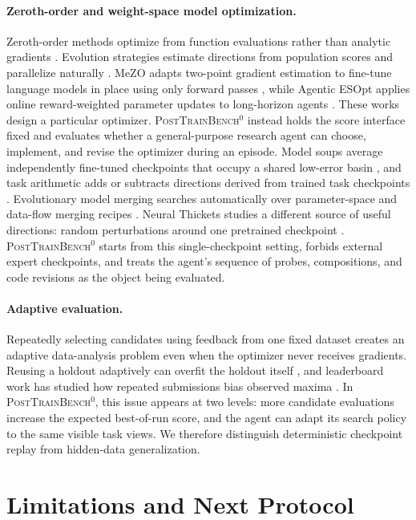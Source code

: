 \documentclass{article}
\newcommand{\bench}{\textsc{PostTrainBench}$^{0}$}
\begin{document}
\paragraph{Zeroth-order and weight-space model optimization.}
Zeroth-order methods optimize from function evaluations rather than analytic gradients
\citep{liu2020primer}. Evolution strategies estimate directions from population scores and
parallelize naturally \citep{salimans2017es}. MeZO adapts two-point gradient estimation to
fine-tune language models in place using only forward passes \citep{malladi2023mezo}, while
Agentic ESOpt applies online reward-weighted parameter updates to long-horizon agents
\citep{zheng2026agenticesopt}. These works design a particular optimizer. \bench{} instead
holds the score interface fixed and evaluates whether a general-purpose research agent can
choose, implement, and revise the optimizer during an episode. Model soups average
independently fine-tuned checkpoints that occupy a shared low-error
basin \citep{wortsman2022modelsoups}, and task arithmetic adds or subtracts directions
derived from trained task checkpoints \citep{ilharco2022taskarithmetic}. Evolutionary model
merging searches automatically over parameter-space and data-flow merging recipes
\citep{akiba2024evolutionarymerging}. Neural Thickets studies a different source of useful
directions: random perturbations around one pretrained checkpoint
\citep{gan2026neuralthickets}. \bench{} starts from this single-checkpoint setting, forbids
external expert checkpoints, and treats the agent's sequence of probes, compositions, and
code revisions as the object being evaluated.

\paragraph{Adaptive evaluation.}
Repeatedly selecting candidates using feedback from one fixed dataset creates an adaptive
data-analysis problem even when the optimizer never receives gradients. Reusing a holdout
adaptively can overfit the holdout itself \citep{dwork2015adaptive}, and leaderboard work
has studied how repeated submissions bias observed maxima \citep{blum2015ladder}. In
\bench, this issue appears at two levels: more candidate evaluations increase the expected
best-of-run score, and the agent can adapt its search policy to the same visible task views.
We therefore distinguish deterministic checkpoint replay from hidden-data generalization.

\section{Limitations and Next Protocol}
\end{document}
